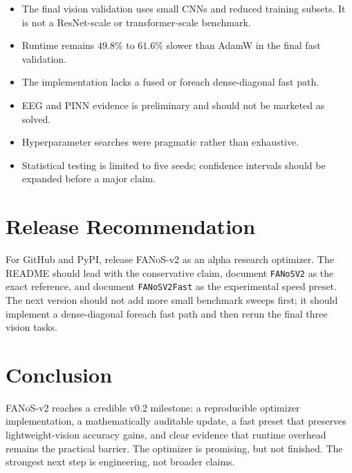 \documentclass[11pt]{article}
\begin{document}
\begin{itemize}
\item The final vision validation uses small CNNs and reduced training subsets. It is not a ResNet-scale or transformer-scale benchmark.
\item Runtime remains $49.8\%$ to $61.6\%$ slower than AdamW in the final fast validation.
\item The implementation lacks a fused or foreach dense-diagonal fast path.
\item EEG and PINN evidence is preliminary and should not be marketed as solved.
\item Hyperparameter searches were pragmatic rather than exhaustive.
\item Statistical testing is limited to five seeds; confidence intervals should be expanded before a major claim.
\end{itemize}

\section{Release Recommendation}

For GitHub and PyPI, release FANoS-v2 as an alpha research optimizer. The README should lead with the conservative claim, document \texttt{FANoSV2} as the exact reference, and document \texttt{FANoSV2Fast} as the experimental speed preset. The next version should not add more small benchmark sweeps first; it should implement a dense-diagonal foreach fast path and then rerun the final three vision tasks.

\section{Conclusion}

FANoS-v2 reaches a credible v0.2 milestone: a reproducible optimizer implementation, a mathematically auditable update, a fast preset that preserves lightweight-vision accuracy gains, and clear evidence that runtime overhead remains the practical barrier. The optimizer is promising, but not finished. The strongest next step is engineering, not broader claims.
\end{document}
